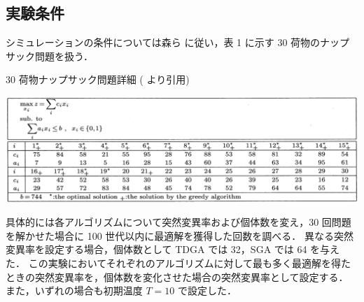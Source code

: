 \documentclass[dvipdfmx,autodetect-engine]{ujarticle}
\begin{document}
	\subsection{実験条件}
	シミュレーションの条件については森ら \cite{199682} に従い，表 1 に示す 30 荷物のナップサック問題を扱う．
	\begin{table}[t]
		\begin{center}
			\caption{30 荷物ナップサック問題詳細 (\cite{199682} より引用)}
			\includegraphics[width=15cm]{./fig/knapsack.png}
			\label{fig:knapsack}
		\end{center}
	\end{table}
	具体的には各アルゴリズムについて突然変異率および個体数を変え，30 回問題を解かせた場合に 100 世代以内に最適解を獲得した回数を調べる．
	異なる突然変異率を設定する場合，個体数として TDGA では 32，SGA では 64 を与えた．
	この実験においてそれぞれのアルゴリズムに対して最も多く最適解を得たときの突然変異率を，個体数を変化させた場合の突然変異率として設定する．
	また，いずれの場合も初期温度 $T = 10$ で設定した．
\end{document}
